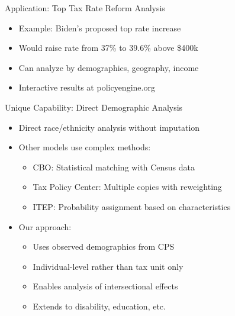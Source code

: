 \documentclass{beamer}
\begin{document}
\begin{frame}{Application: Top Tax Rate Reform Analysis}
    \begin{itemize}
        \item Example: Biden's proposed top rate increase
        \item Would raise rate from 37\% to 39.6\% above \$400k
    \end{itemize}
    \begin{table}
        \centering
        
    \end{table}
    \begin{itemize}
        \item Can analyze by demographics, geography, income
        \item Interactive results at policyengine.org
    \end{itemize}
\end{frame}

\begin{frame}{Unique Capability: Direct Demographic Analysis}
    \begin{itemize}
        \item Direct race/ethnicity analysis without imputation
        \item Other models use complex methods:
        \begin{itemize}
            \item CBO: Statistical matching with Census data
            \item Tax Policy Center: Multiple copies with reweighting
            \item ITEP: Probability assignment based on characteristics
        \end{itemize}
        \item Our approach:
        \begin{itemize}
            \item Uses observed demographics from CPS
            \item Individual-level rather than tax unit only
            \item Enables analysis of intersectional effects
            \item Extends to disability, education, etc.
        \end{itemize}
    \end{itemize}
\end{frame}
\end{document}
